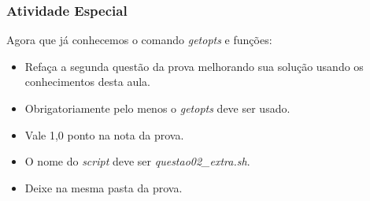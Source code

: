 \documentclass{beamer}
\begin{document}
   \begin{frame}
      \frametitle{Atividade Especial}
      Agora que já conhecemos o comando \textit{getopts} e funções:
      \begin{itemize}
         \item Refaça a segunda questão da prova melhorando sua solução usando os conhecimentos desta aula.
	 \item Obrigatoriamente pelo menos o \textit{getopts} deve ser usado.
	 \item Vale 1,0 ponto na nota da prova.
	 \item O nome do \textit{script} deve ser \textit{questao02\_extra.sh}.
	 \item Deixe na mesma pasta da prova.
      \end{itemize}
   \end{frame}

\end{document}
